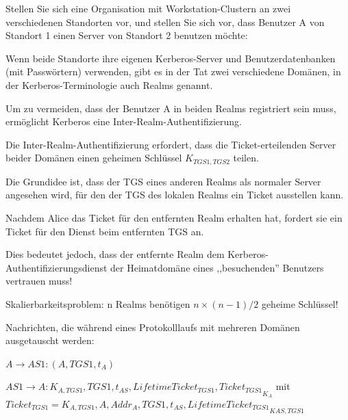 \documentclass[a4paper]{article}
\begin{document}
\begin{multicols}{3}
      \begin{itemize*}
            \item Stellen Sie sich eine Organisation mit Workstation-Clustern an zwei
            verschiedenen Standorten vor, und stellen Sie sich vor, dass Benutzer
            A von Standort 1 einen Server von Standort 2 benutzen möchte:
            \begin{itemize*}
                  \item Wenn beide Standorte ihre eigenen Kerberos-Server und Benutzerdatenbanken (mit Passwörtern) verwenden, gibt es in der Tat zwei verschiedene Domänen, in der Kerberos-Terminologie auch Realms genannt.
                  \item Um zu vermeiden, dass der Benutzer A in beiden Realms registriert sein muss, ermöglicht Kerberos eine Inter-Realm-Authentifizierung.
            \end{itemize*}
            \item Die Inter-Realm-Authentifizierung erfordert, dass die
            Ticket-erteilenden Server beider Domänen einen geheimen Schlüssel
            $K_{TGS1,TGS2}$ teilen.
            \begin{itemize*}
                  \item Die Grundidee ist, dass der TGS eines anderen Realms als normaler Server angesehen wird, für den der TGS des lokalen Realms ein Ticket ausstellen kann.
                  \item Nachdem Alice das Ticket für den entfernten Realm erhalten hat, fordert sie ein Ticket für den Dienst beim entfernten TGS an.
                  \item Dies bedeutet jedoch, dass der entfernte Realm dem Kerberos-Authentifizierungsdienst der Heimatdomäne eines ,,besuchenden'' Benutzers vertrauen muss!
                  \item Skalierbarkeitsproblem: n Realms benötigen $n\times(n-1)/2$ geheime Schlüssel!
            \end{itemize*}
            \item Nachrichten, die während eines Protokolllaufs mit mehreren Domänen
            ausgetauscht werden:
            \begin{enumerate*}
                  \def\labelenumi{\arabic{enumi}.}
                  \item $A\rightarrow AS1:(A,TGS1, t_A)$
                  \item $AS1\rightarrow A:{K_{A,TGS1}, TGS1, t_{AS}, LifetimeTicket_{TGS1}, Ticket_{TGS1} }_{K_A}$ mit $Ticket_{TGS1}={K_{A,TGS1}, A, Addr_A, TGS1, t_{AS}, LifetimeTicket_{TGS1}}_{{K}{AS,TGS1}}$

\end{enumerate*}
\end{itemize*}
\end{multicols}
\end{document}
